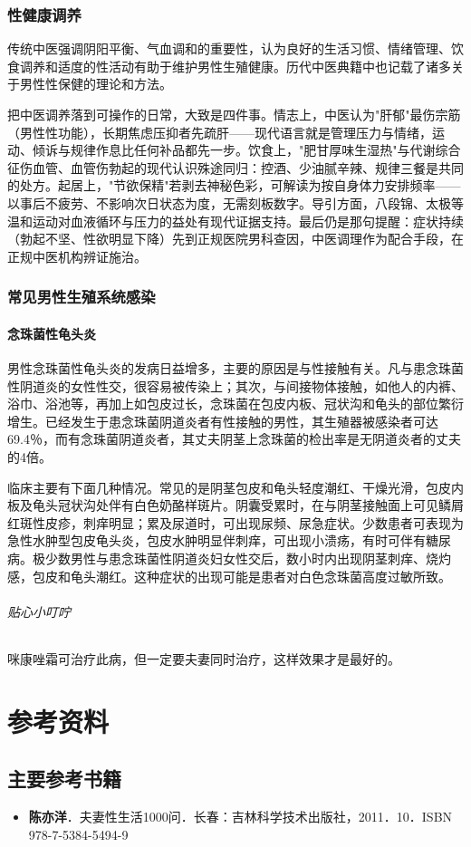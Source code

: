 \subsection{性健康调养}

传统中医强调阴阳平衡、气血调和的重要性，认为良好的生活习惯、情绪管理、饮食调养和适度的性活动有助于维护男性生殖健康。历代中医典籍中也记载了诸多关于男性性保健的理论和方法。


把中医调养落到可操作的日常，大致是四件事。情志上，中医认为"肝郁"最伤宗筋（男性性功能），长期焦虑压抑者先疏肝——现代语言就是管理压力与情绪，运动、倾诉与规律作息比任何补品都先一步。饮食上，"肥甘厚味生湿热"与代谢综合征伤血管、血管伤勃起的现代认识殊途同归：控酒、少油腻辛辣、规律三餐是共同的处方。起居上，"节欲保精"若剥去神秘色彩，可解读为按自身体力安排频率——以事后不疲劳、不影响次日状态为度，无需刻板数字。导引方面，八段锦、太极等温和运动对血液循环与压力的益处有现代证据支持。最后仍是那句提醒：症状持续（勃起不坚、性欲明显下降）先到正规医院男科查因，中医调理作为配合手段，在正规中医机构辨证施治。

\subsection{常见男性生殖系统感染}

\subsubsection{念珠菌性龟头炎}

男性念珠菌性龟头炎的发病日益增多，主要的原因是与性接触有关。凡与患念珠菌性阴道炎的女性性交，很容易被传染上；其次，与间接物体接触，如他人的内裤、浴巾、浴池等，再加上如包皮过长，念珠菌在包皮内板、冠状沟和龟头的部位繁衍增生。已经发生于患念珠菌阴道炎者有性接触的男性，其生殖器被感染者可达69.4％，而有念珠菌阴道炎者，其丈夫阴茎上念珠菌的检出率是无阴道炎者的丈夫的4倍。

临床主要有下面几种情况。常见的是阴茎包皮和龟头轻度潮红、干燥光滑，包皮内板及龟头冠状沟处伴有白色奶酪样斑片。阴囊受累时，在与阴茎接触面上可见鳞屑红斑性皮疹，刺痒明显；累及尿道时，可出现尿频、尿急症状。少数患者可表现为急性水肿型包皮龟头炎，包皮水肿明显伴刺痒，可出现小溃疡，有时可伴有糖尿病。极少数男性与患念珠菌性阴道炎妇女性交后，数小时内出现阴茎刺痒、烧灼感，包皮和龟头潮红。这种症状的出现可能是患者对白色念珠菌高度过敏所致。

\subparagraph{贴心小叮咛}

咪康唑霜可治疗此病，但一定要夫妻同时治疗，这样效果才是最好的。

\chapter{参考资料}

\section{主要参考书籍}

\begin{itemize}
    \item \textbf{陈亦洋}．夫妻性生活1000问．长春：吉林科学技术出版社，2011．10．ISBN 978-7-5384-5494-9
\end{itemize}

